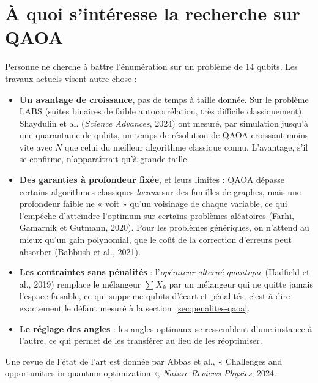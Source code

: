 \section{À quoi s'intéresse la recherche sur QAOA}\label{sec:recherche}
Personne ne cherche à battre l'énumération sur un problème de 14 qubits. Les travaux actuels visent autre chose :
\begin{itemize}
\item \textbf{Un avantage de croissance}, pas de temps à taille donnée. Sur le problème LABS (suites binaires de faible autocorrélation, très difficile classiquement), Shaydulin et al. (\emph{Science Advances}, 2024) ont mesuré, par simulation jusqu'à une quarantaine de qubits, un temps de résolution de QAOA croissant moins vite avec $N$ que celui du meilleur algorithme classique connu. L'avantage, s'il se confirme, n'apparaîtrait qu'à grande taille.
\item \textbf{Des garanties à profondeur fixée}, et leurs limites : QAOA dépasse certains algorithmes classiques \emph{locaux} sur des familles de graphes, mais une profondeur faible ne « voit » qu'un voisinage de chaque variable, ce qui l'empêche d'atteindre l'optimum sur certains problèmes aléatoires (Farhi, Gamarnik et Gutmann, 2020). Pour les problèmes génériques, on n'attend au mieux qu'un gain polynomial, que le coût de la correction d'erreurs peut absorber (Babbush et al., 2021).
\item \textbf{Les contraintes sans pénalités} : l'\emph{opérateur alterné quantique} (Hadfield et al., 2019) remplace le mélangeur $\sum X_k$ par un mélangeur qui ne quitte jamais l'espace faisable, ce qui supprime qubits d'écart et pénalités, c'est-à-dire exactement le défaut mesuré à la section~\ref{sec:penalites-qaoa}.
\item \textbf{Le réglage des angles} : les angles optimaux se ressemblent d'une instance à l'autre, ce qui permet de les transférer au lieu de les réoptimiser.
\end{itemize}
Une revue de l'état de l'art est donnée par Abbas et al., « Challenges and opportunities in quantum optimization », \emph{Nature Reviews Physics}, 2024.

